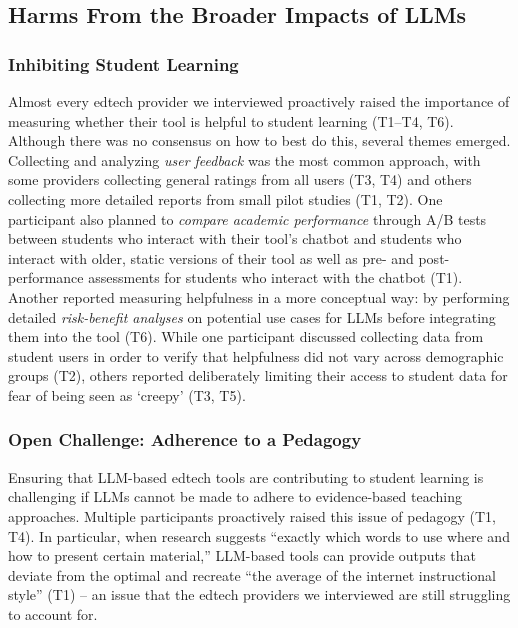 \subsection{Harms From the Broader Impacts of LLMs}\label{s-results-broader-harms-edtech}
\subsubsection*{Inhibiting Student Learning} 
Almost every edtech provider we interviewed proactively raised the importance of measuring whether their tool is helpful to student learning (T1--T4, T6). Although there was no consensus on how to best do this, several themes emerged. Collecting and analyzing \textit{user feedback} was the most common approach, with some providers collecting general ratings from all users (T3, T4) and others collecting more detailed reports from small pilot studies (T1, T2). One participant also planned to \textit{compare academic performance} through A/B tests between students who interact with their tool's chatbot and students who interact with older, static versions of their tool as well as pre- and post-performance assessments for students who interact with the chatbot (T1). Another reported measuring helpfulness in a more conceptual way: by performing detailed \textit{risk-benefit analyses} on potential use cases for LLMs before integrating them into the tool (T6). While one participant discussed collecting data from student users in order to verify that helpfulness did not vary across demographic groups (T2), others reported deliberately limiting their access to student data for fear of being seen as `creepy' (T3, T5).

\subsubsection*{Open Challenge: Adherence to a Pedagogy}
Ensuring that LLM-based edtech tools are contributing to student learning is challenging if LLMs cannot be made to adhere to evidence-based teaching approaches. Multiple participants proactively raised this issue of pedagogy (T1, T4). In particular, when research suggests ``exactly which words to use where and how to present certain material,'' LLM-based tools can provide outputs that deviate from the optimal and recreate ``the average of the internet instructional style'' (T1) -- an issue that the edtech providers we interviewed are still struggling to account for.

